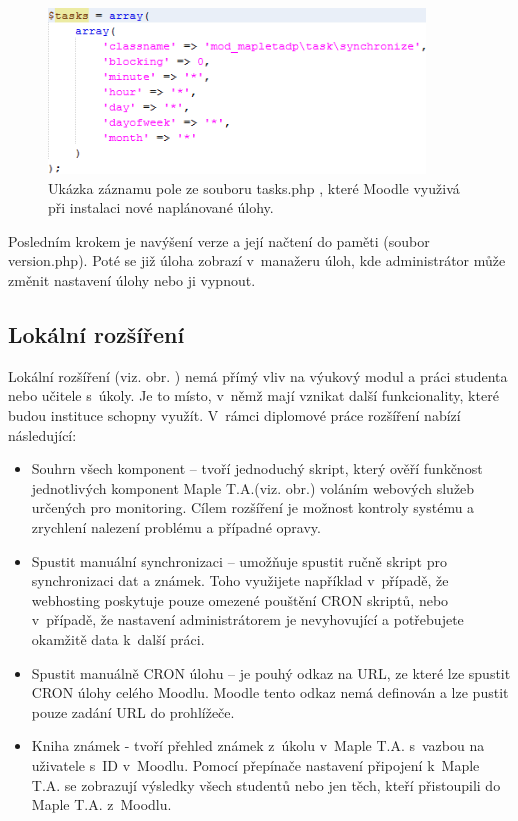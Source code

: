 \documentclass[
print,
  11pt,
  table,   
  nolof,    
  nolot,
  oneside,
  draft
]{fithesis3}
\begin{document}
		\begin{figure}
		  \begin{center}
		    \includegraphics[width=100mm]{images/cron-registrace.png}
		   \end{center}
		  \caption{Ukázka záznamu pole ze souboru tasks.php , které Moodle využivá při instalaci nové naplánované úlohy.}
		  \label{fig:cronregistrace}
		\end{figure}
Posledním krokem je navýšení verze a její načtení do paměti (soubor version.php). Poté se již úloha zobrazí v~manažeru úloh, kde administrátor může změnit nastavení úlohy nebo ji vypnout.

		\subsection{Lokální rozšíření}
Lokální rozšíření (viz. obr. ) nemá přímý vliv na výukový modul a práci studenta nebo učitele s~úkoly. Je to místo, v~němž mají vznikat další funkcionality, které budou instituce schopny využít. V~rámci diplomové práce rozšíření nabízí následující:
\begin{itemize}
 \item Souhrn všech komponent -- tvoří jednoduchý skript, který ověří funkčnost jednotlivých komponent Maple T.A.(viz. obr.) voláním webových služeb určených pro monitoring. Cílem rozšíření je možnost kontroly systému a zrychlení nalezení problému a případné opravy.
 \item Spustit manuální synchronizaci -- umožňuje spustit ručně skript pro synchronizaci dat a známek. Toho využijete například v~případě, že webhosting poskytuje pouze omezené pouštění CRON skriptů, nebo v~případě, že nastavení administrátorem je nevyhovující a potřebujete okamžitě data k~další práci.
 \item Spustit manuálně CRON úlohu -- je pouhý odkaz na URL, ze které lze spustit CRON úlohy celého Moodlu. Moodle tento odkaz nemá definován a lze pustit pouze zadání URL do prohlížeče.
 \item Kniha známek - tvoří přehled známek z~úkolu v~Maple T.A. s~vazbou na uživatele s~ID v~Moodlu. Pomocí přepínače nastavení připojení k~Maple T.A. se zobrazují výsledky všech studentů nebo jen těch, kteří přistoupili do Maple T.A. z~Moodlu.
\end{itemize}
\end{document}
